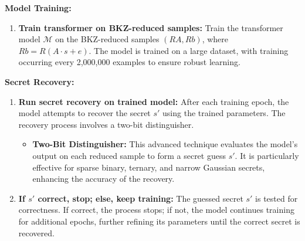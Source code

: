 \documentclass{article}
\begin{document}
\textbf{Model Training:}
\begin{enumerate}
    \item \textbf{Train transformer on BKZ-reduced samples:} Train the transformer model \(\mathcal{M}\) on the BKZ-reduced samples \((RA, Rb)\), where \(Rb = R(A \cdot s + e)\). The model is trained on a large dataset, with training occurring every 2,000,000 examples to ensure robust learning.
\end{enumerate}

\textbf{Secret Recovery:}
\begin{enumerate}
    \item \textbf{Run secret recovery on trained model:} After each training epoch, the model attempts to recover the secret \(s'\) using the trained parameters. The recovery process involves a two-bit distinguisher.
        \begin{itemize}
            \item \textbf{Two-Bit Distinguisher:} This advanced technique evaluates the model's output on each reduced sample to form a secret guess \(s'\). It is particularly effective for sparse binary, ternary, and narrow Gaussian secrets, enhancing the accuracy of the recovery.
        \end{itemize}
    \item \textbf{If \(s'\) correct, stop; else, keep training:} The guessed secret \(s'\) is tested for correctness. If correct, the process stops; if not, the model continues training for additional epochs, further refining its parameters until the correct secret is recovered.
\end{enumerate}


\newpage
\end{document}

